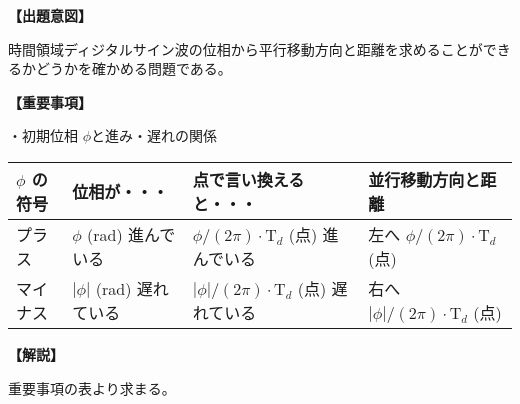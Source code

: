 \noindent \textbf{【出題意図】}

\bigskip
\noindent 時間領域ディジタルサイン波の位相から平行移動方向と距離を求めることができるかどうかを確かめる問題である。

\vspace{1em}
\noindent \textbf{【重要事項】}

\noindent ・初期位相 $\phi$と進み・遅れの関係

\medskip
\begin{center}
\small
\begin{tabularx}{0.9\fbwidth}{|X|X|X|X|}
\hline
$\phi$ の符号&  位相が・・・   & 点で言い換えると・・・   & 並行移動方向と距離 \\
\hline
プラス &  $\phi$ (rad) 進んでいる & $\phi/(2\pi) \cdot \textrm{T}_d$ (点) 進んでいる & 左へ $\phi/(2\pi) \cdot \textrm{T}_d$ (点) \\
\hline
マイナス &  $|\phi|$ (rad) 遅れている & $|\phi|/(2\pi) \cdot \textrm{T}_d$ (点) 遅れている & 右へ $|\phi|/(2\pi) \cdot \textrm{T}_d$ (点) \\
\hline
\end{tabularx}
\end{center}

\bigskip

\vspace{1em}
\noindent \textbf{【解説】}

\bigskip
\noindent 重要事項の表より求まる。
